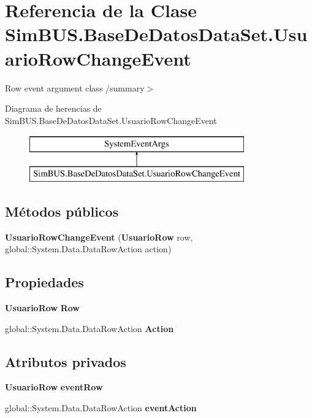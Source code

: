 \section{Referencia de la Clase Sim\-B\-U\-S.\-Base\-De\-Datos\-Data\-Set.\-Usuario\-Row\-Change\-Event}
\label{class_sim_b_u_s_1_1_base_de_datos_data_set_1_1_usuario_row_change_event}


Row event argument class /summary$>$  


Diagrama de herencias de Sim\-B\-U\-S.\-Base\-De\-Datos\-Data\-Set.\-Usuario\-Row\-Change\-Event\begin{figure}[H]
\begin{center}
\leavevmode
\includegraphics[height=2.000000cm]{class_sim_b_u_s_1_1_base_de_datos_data_set_1_1_usuario_row_change_event}
\end{center}
\end{figure}
\subsection*{Métodos públicos}
\begin{DoxyCompactItemize}
\item 
{\bf Usuario\-Row\-Change\-Event} ({\bf Usuario\-Row} row, global\-::\-System.\-Data.\-Data\-Row\-Action action)
\end{DoxyCompactItemize}
\subsection*{Propiedades}
\begin{DoxyCompactItemize}
\item 
{\bf Usuario\-Row} {\bf Row}\hspace{0.3cm}{\ttfamily  [get]}
\item 
global\-::\-System.\-Data.\-Data\-Row\-Action {\bf Action}\hspace{0.3cm}{\ttfamily  [get]}
\end{DoxyCompactItemize}
\subsection*{Atributos privados}
\begin{DoxyCompactItemize}
\item 
{\bf Usuario\-Row} {\bf event\-Row}
\item 
global\-::\-System.\-Data.\-Data\-Row\-Action {\bf event\-Action}
\end{DoxyCompactItemize}



